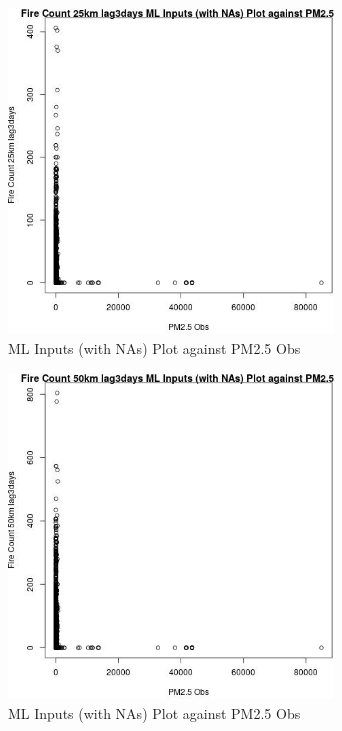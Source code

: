 \begin{figure} 
\centering  
\includegraphics[width=0.77\textwidth]{Code_Outputs/Report_ML_input_PM25_Step4_part_f_de_duplicated_aves_prioritize_24hr_obswNAs_Fire_Count_25km_lag3daysvPM25_Obs.jpg} 
\caption{\label{fig:Report_ML_input_PM25_Step4_part_f_de_duplicated_aves_prioritize_24hr_obswNAsFire_Count_25km_lag3daysvPM25_Obs}ML Inputs (with NAs) Plot against PM2.5 Obs} 
\end{figure} 
 

\begin{figure} 
\centering  
\includegraphics[width=0.77\textwidth]{Code_Outputs/Report_ML_input_PM25_Step4_part_f_de_duplicated_aves_prioritize_24hr_obswNAs_Fire_Count_50km_lag3daysvPM25_Obs.jpg} 
\caption{\label{fig:Report_ML_input_PM25_Step4_part_f_de_duplicated_aves_prioritize_24hr_obswNAsFire_Count_50km_lag3daysvPM25_Obs}ML Inputs (with NAs) Plot against PM2.5 Obs} 
\end{figure} 
 

